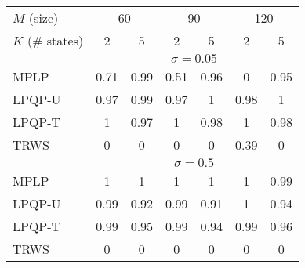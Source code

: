 \begin{tabular}{l cc cc cc}
\hline
$M$ (size)  &  \multicolumn{2}{c}{60} &  \multicolumn{2}{c}{90} &  \multicolumn{2}{c}{120} \\
$K$ (\# states)  &  2  &  5  &  2  & 5  &  2  & 5 \\
\hline\hline
 & \multicolumn{6}{c}{$\sigma=0.05$} \\
\cline{2-7}
MPLP   &    0.71  &    0.99   &   0.51  &    0.96   &   0  &    0.95 \\
LPQP-U   &    0.97  &    0.99   &   0.97  &    1   & 0.98  &    1 \\
LPQP-T   &    1  &    0.97   &   1  &    0.98   & 1  &    0.98 \\
TRWS   &    0  &    0   &   0  &    0   &   0.39  &    0\\
\cline{2-7}
 & \multicolumn{6}{c}{$\sigma=0.5$}  \\
\cline{2-7}
MPLP   &    1  &    1   &   1  &    1   & 1  &    0.99\\
LPQP-U   &    0.99  &    0.92   &   0.99  &    0.91   &   1  &    0.94\\
LPQP-T   &    0.99  &    0.95   &   0.99  &    0.94   &   0.99  &    0.96\\
TRWS   &    0  &    0   &   0  &    0   &   0  &    0\\
\hline
\end{tabular}
